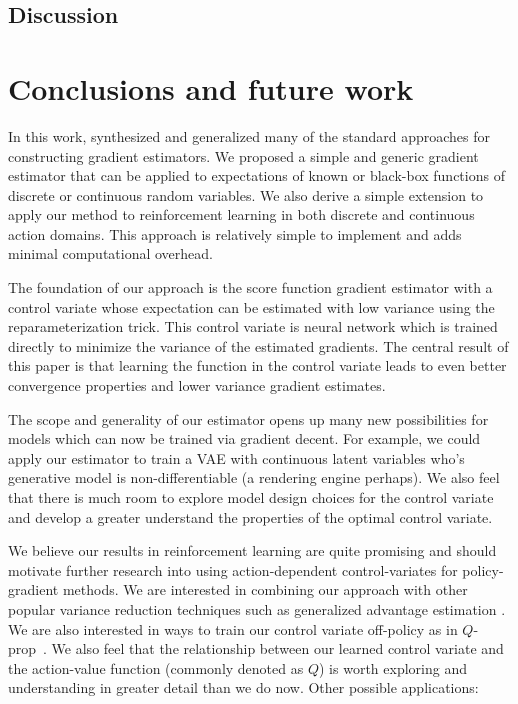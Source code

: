 \documentclass{article}
\begin{document}
\subsection{Discussion}


\section{Conclusions and future work}
\label{conclusion}

In this work, synthesized and generalized many of the standard approaches for constructing gradient estimators.
We proposed a simple and generic gradient estimator that can be applied to expectations of known or black-box functions of discrete or continuous random variables. We also derive a simple extension to apply our method to reinforcement learning in both discrete and continuous action domains. 
This approach is relatively simple to implement and adds minimal computational overhead. 

The foundation of our approach is the score function gradient estimator with a control variate whose expectation can be estimated with low variance using the reparameterization trick.
This control variate is neural network which is trained directly to minimize the variance of the estimated gradients.
The central result of this paper is that learning the function in the control variate leads to even better convergence properties and lower variance gradient estimates. 

The scope and generality of our estimator opens up many new possibilities for models which can now be trained via gradient decent. For example, we could apply our estimator to train a VAE with continuous latent variables who's generative model is non-differentiable (a rendering engine perhaps). We also feel that there is much room to explore model design choices for the control variate and develop a greater understand the properties of the optimal control variate. 

We believe our results in reinforcement learning are quite promising and should motivate further research into using action-dependent control-variates for policy-gradient methods. We are interested in combining our approach with other popular variance reduction techniques such as generalized advantage estimation \cite{kimura2000analysis}. We are also interested in ways to train our control variate off-policy as in $Q$-prop~\cite{gu2016q}. We also feel that the relationship between our learned control variate and the action-value function (commonly denoted as $Q$) is worth exploring and understanding in greater detail than we do now. 
Other possible applications:
\end{document}
